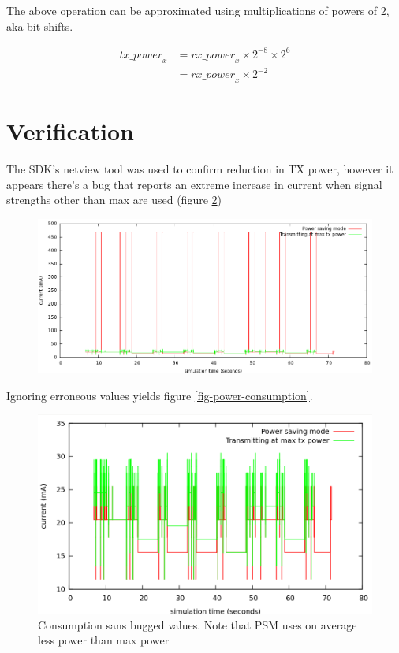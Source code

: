\documentclass{article}
\begin{document}
The above operation can be approximated using multiplications of powers of 2, aka bit shifts.

\begin{align*}
\mathit{tx\_power}_x
&= \mathit{rx\_power}_x \times 2^{-8} \times 2^6 \\
&= \mathit{rx\_power}_x \times 2^{-2}
\end{align*}

\section{Verification}

The SDK's netview tool was used to confirm reduction in TX power, however it appears there's a bug
that reports an extreme increase in current when signal strengths other than max are used (figure \ref{fig:crazy-power})

\begin{figure}
\noindent\hspace*{-60pt}\includegraphics[scale=0.5]{power-consumption.png}
\caption{}
\label{fig:crazy-power}
\end{figure}

Ignoring erroneous values yields figure \ref{fig-power-consumption}.

\begin{figure}
  \noindent\hspace*{-60pt}\includegraphics[scale=0.5]{power-consumption-saving.png}
  \caption{Consumption sans bugged values. Note that PSM uses on average less power than max power}
  \label{fig:crazy-power}
\end{figure}
\end{document}
